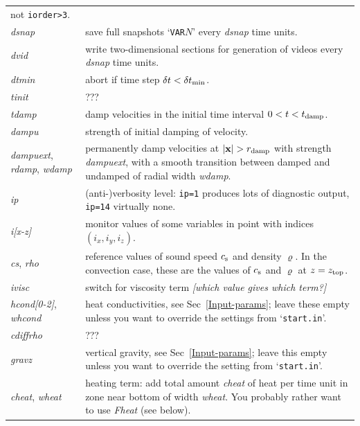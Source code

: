 \documentclass[12pt,twoside,notitlepage,a4paper]{article}
\makeatletter
\newcommand{\Note}[1]{\emph{[#1]}}
\newcommand{\code}[1]{\texttt{#1}}
\newcommand{\var}[1]{\textsl{#1}\index{#1@\emph{#1}}\/}
\newcommand{\file}[1]{`\texttt{#1}'}
\newcommand{\vekt}[1] {\mathbf{#1}}
\newcommand{\cs}            {c_{\rm s}}
\newcommand{\xv}            {\vekt{x}}
\makeatother
\begin{document}
\begin{longtable}{lp{}}
                 not \code{iorder>3}.\\
  \var{dsnap}  & save full snapshots \file{VAR$N$} every \var{dsnap} time
                 units. \\
  \var{dvid}   & write two-dimensional sections for generation of videos
                 every \var{dsnap} time units. \\
  \var{dtmin}  & abort if time step $\delta t < \delta t_{\rm min}$. \\
  \var{tinit}  & ??? \\
  \var{tdamp}  & damp velocities in the initial time interval
                 $0 < t < t_{\rm damp}$. \\
  \var{dampu}  & strength of initial damping of velocity. \\
  \var{dampuext}, \var{rdamp}, \var{wdamp}
               & permanently damp velocities at $|\xv| > r_{\rm damp}$
                 with strength \var{dampuext}, with a smooth transition
                 between damped and undamped of radial width \var{wdamp}. \\
  \var{ip}     & (anti-)verbosity level: \code{ip=1} produces lots of
                 diagnostic output, \code{ip=14} virtually none. \\
  \var{i[x-z]} & monitor values of some variables in point with indices
                 $(i_x,i_y,i_z)$. \\
  \var{cs}, \var{rho}
               & reference values of sound speed $\cs$ and density
                 $\varrho$. In the convection case, these are the values of
                 $\cs$ and $\varrho$ at $z=z_{\rm top}$. \\
  \var{ivisc}  & switch for viscosity term
                 \Note{which value gives which term?} \\
  \var{hcond[0-2]}, \var{whcond}
               & heat conductivities, see Sec~\ref{Input-params}; leave
                 these empty unless you want to override the settings from
                 \file{start.in}. \\
  \var{cdiffrho}
               & ??? \\
  \var{gravz}  & vertical gravity, see Sec~\ref{Input-params}; leave
                 this empty unless you want to override the setting from
                 \file{start.in}. \\
  \var{cheat}, \var{wheat}
               & heating term: add total amount \var{cheat} of heat per
                 time unit in zone near bottom of width \var{wheat}.
                 You probably rather want to use \var{Fheat} (see below). \\

\end{longtable}
\end{document}
